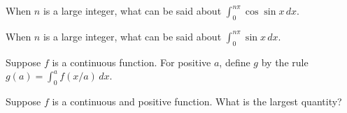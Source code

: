 \documentclass{ximera}
\begin{document}
\begin{shuffle}
\begin{problem}
  When $n$ is a large integer, what can be said about $\int_0^{n \pi} \cos \sin x \, dx$.
  \begin{multipleChoice}
  \end{multipleChoice}
\end{problem}

\begin{problem}
  When $n$ is a large integer, what can be said about $\int_0^{n \pi} \sin x \, dx$.
  \begin{multipleChoice}
  \end{multipleChoice}
\end{problem}



\begin{problem}
  Suppose $f$ is a continuous function.  For positive $a$, define $g$ by the rule $g(a) = \int_0^a f(x/a) \, dx$.
  \begin{multipleChoice}
  \end{multipleChoice}
\end{problem}

\begin{problem}
  Suppose $f$ is a continuous and positive function.  What is the largest quantity?
  \begin{multipleChoice}
  \end{multipleChoice}
\end{problem}




\end{shuffle}
\end{document}
